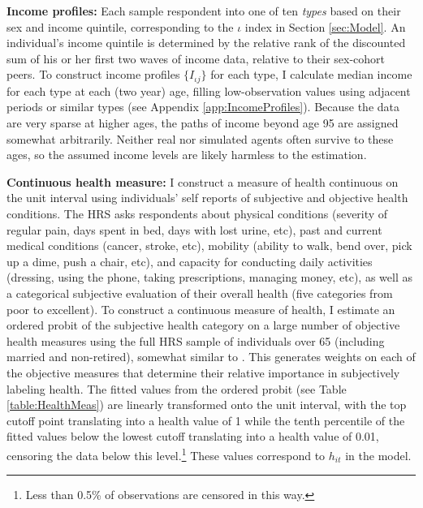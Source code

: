 \documentclass[12pt,pdftex,letterpaper]{article}
\newcommand{\Type}{\iota}
\newcommand{\Health}{h}
\newcommand{\Inc}{I}
\newcommand{\Age}{j}
\begin{document}
\noindent \textbf{Income profiles:} Each sample respondent into one of ten \textit{types} based on their sex and income quintile, corresponding to the $\Type$ index in Section \ref{sec:Model}.  An individual's income quintile is determined by the relative rank of the discounted sum of his or her first two waves of income data, relative to their sex-cohort peers.  To construct income profiles $\{\Inc_{\Type \Age}\}$ for each type, I calculate median income for each type at each (two year) age, filling low-observation values using adjacent periods or similar types (see Appendix \ref{app:IncomeProfiles}).  Because the data are very sparse at higher ages, the paths of income beyond age 95 are assigned somewhat arbitrarily.  Neither real nor simulated agents often survive to these ages, so the assumed income levels are likely harmless to the estimation.

\vspace{0.5cm}

\noindent \textbf{Continuous health measure:} I construct a measure of health continuous on the unit interval using individuals' self reports of subjective and objective health conditions.  The HRS asks respondents about physical conditions (severity of regular pain, days spent in bed, days with lost urine, etc), past and current medical conditions (cancer, stroke, etc), mobility (ability to walk, bend over, pick up a dime, push a chair, etc), and capacity for conducting daily activities (dressing, using the phone, taking prescriptions, managing money, etc), as well as a categorical subjective evaluation of their overall health (five categories from poor to excellent).  To construct a continuous measure of health, I estimate an ordered probit of the subjective health category on a large number of objective health measures using the full HRS sample of individuals over 65 (including married and non-retired), somewhat similar to \cite{bound04}.  This generates weights on each of the objective measures that determine their relative importance in subjectively labeling health.  The fitted values from the ordered probit (see Table \ref{table:HealthMeas}) are linearly transformed onto the unit interval, with the top cutoff point translating into a health value of 1 while the tenth percentile of the fitted values below the lowest cutoff translating into a health value of 0.01, censoring the data below this level.\footnote{Less than 0.5\% of observations are censored in this way.}  These values correspond to $\Health_{it}$ in the model.
\end{document}
